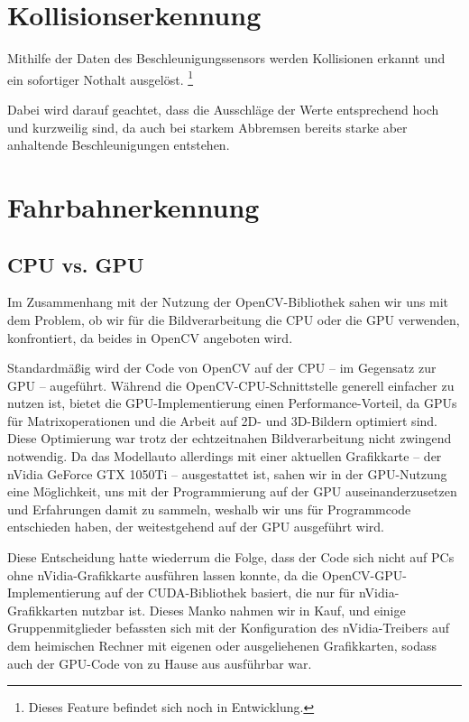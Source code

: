 \documentclass[a4paper,12pt]{report}
\begin{document}
\chapter{Kollisionserkennung}

	Mithilfe der Daten des Beschleunigungssensors werden Kollisionen erkannt und ein sofortiger Nothalt ausgelöst.
	\footnote{Dieses Feature befindet sich noch in Entwicklung.}

	Dabei wird darauf geachtet, dass die Ausschläge der Werte entsprechend hoch und kurzweilig sind, da auch bei starkem Abbremsen bereits starke aber anhaltende Beschleunigungen entstehen.


\chapter{Fahrbahnerkennung}


\section{CPU vs. GPU}
Im Zusammenhang mit der Nutzung der OpenCV-Bibliothek sahen wir uns mit dem Problem, ob wir für die Bildverarbeitung die CPU oder die GPU verwenden, konfrontiert, da beides in OpenCV angeboten wird.

Standardmäßig wird der Code von OpenCV auf der CPU -- im Gegensatz zur GPU -- augeführt.
Während die OpenCV-CPU-Schnittstelle generell einfacher zu nutzen ist, bietet die GPU-Implementierung einen Performance-Vorteil, da GPUs für Matrixoperationen und die Arbeit auf 2D- und 3D-Bildern optimiert sind.
Diese Optimierung war trotz der echtzeitnahen Bildverarbeitung nicht zwingend notwendig.
Da das Modellauto allerdings mit einer aktuellen Grafikkarte -- der nVidia GeForce GTX 1050Ti -- ausgestattet ist, sahen wir in der GPU-Nutzung eine Möglichkeit, uns mit der Programmierung auf der GPU auseinanderzusetzen und Erfahrungen damit zu sammeln, weshalb wir uns für Programmcode entschieden haben, der weitestgehend auf der GPU ausgeführt wird.

Diese Entscheidung hatte wiederrum die Folge, dass der Code sich nicht auf PCs ohne nVidia-Grafikkarte ausführen lassen konnte, da die OpenCV-GPU-Implementierung auf der CUDA-Bibliothek basiert, die nur für nVidia-Grafikkarten nutzbar ist.
Dieses Manko nahmen wir in Kauf, und einige Gruppenmitglieder befassten sich mit der Konfiguration des nVidia-Treibers auf dem heimischen Rechner mit eigenen oder ausgeliehenen Grafikkarten, sodass auch der GPU-Code von zu Hause aus ausführbar war.
\end{document}
